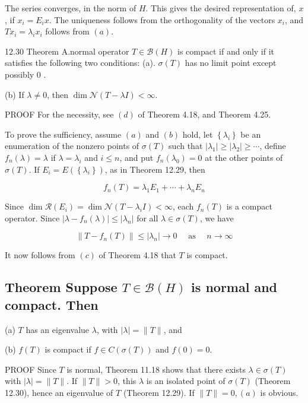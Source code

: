 \documentclass[10pt]{article}
\begin{document}
The series converges, in the norm of $H$. This gives the desired representation of, $x$, if $x_{i}=E_{i} x$. The uniqueness follows from the orthogonality of the vectors $x_{i}$, and $T x_{i}=\lambda_{i} x_{i}$ follows from $(a)$.

12.30 Theorem A.normal operator $T \in \mathscr{B}(H)$ is compact if and only if it satisfies the following two conditions:
(a). $\sigma(T)$ has no limit point except possibly 0 .

(b) If $\lambda \neq 0$, then $\operatorname{dim} \mathscr{N}(T-\lambda I)<\infty$.

PROOF For the necessity, see $(d)$ of Theorem 4.18, and Theorem 4.25.

To prove the sufficiency, assume $(a)$ and $(b)$ hold, let $\left\{\lambda_{i}\right\}$ be an enumeration of the nonzero points of $\sigma(T)$ such that $\left|\lambda_{1}\right| \geq\left|\lambda_{2}\right| \geq \cdots$, define $f_{n}(\lambda)=\lambda$ if $\lambda=\lambda_{i}$ and $i \leq n$, and put $f_{n}\left(\lambda_{0}\right)=0$ at the other points of $\sigma(T)$. If $E_{i}=E\left(\left\{\lambda_{i}\right\}\right)$, as in Theorem 12.29, then

$$
f_{n}(T)=\lambda_{1} E_{1}+\cdots+\lambda_{n} E_{n}
$$

Since $\operatorname{dim} \mathscr{R}\left(E_{i}\right)=\operatorname{dim} \mathscr{N}\left(T-\lambda_{i} I\right)<\infty$, each $f_{n}(T)$ is a compact operator. Since $\left|\lambda-f_{n}(\lambda)\right| \leq\left|\lambda_{n}\right|$ for all $\lambda \in \sigma(T)$, we have

$$
\left\|T-f_{n}(T)\right\| \leq\left|\lambda_{n}\right| \rightarrow 0 \quad \text { as } \quad n \rightarrow \infty
$$

It now follows from $(c)$ of Theorem 4.18 that $T$ is compact.

\subsection{Theorem Suppose $T \in \mathscr{B}(H)$ is normal and compact. Then}
(a) $T$ has an eigenvalue $\lambda$, with $|\lambda|=\|T\|$, and

(b) $f(T)$ is compact if $f \in C(\sigma(T))$ and $f(0)=0$.

PROOF Since $T$ is normal, Theorem 11.18 shows that there exists $\lambda \in \sigma(T)$ with $|\lambda|=\|T\|$. If $\|T\|>0$, this $\lambda$ is an isolated point of $\sigma(T)$ (Theorem 12.30), hence an eigenvalue of $T$ (Theorem 12.29). If $\|T\|=0,(a)$ is obvious.
\end{document}
